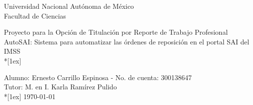 \documentclass[letterpaper,11pt]{report}
\begin{document}
\begin{center}
\begin{Large}
Universidad Nacional Autónoma de México\\
Facultad de Ciencias\\
\end{Large}
\begin{LARGE}
Proyecto para la Opción de Titulación por Reporte de Trabajo Profesional\\
AutoSAI: Sistema para automatizar las órdenes de reposición en el portal SAI del IMSS\\*[1ex]
\end{LARGE}

Alumno: Ernesto Carrillo Espinosa - No. de cuenta: 300138647\\
Tutor: M. en I. Karla Ramírez Pulido\\*[1ex]
\today
\end{center}

\clearpage
{}

\tableofcontents
\listoffigures






% 


\end{document}
